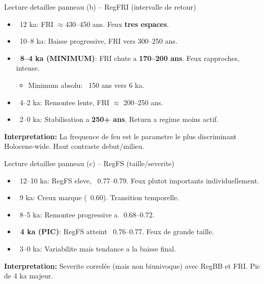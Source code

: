 \documentclass[aspectratio=169,11pt]{beamer}
\begin{document}
\begin{frame}{Lecture detaillee panneau (b) -- RegFRI (intervalle de retour)}
\small
\begin{itemize}
  \item \alert{~12 ka}: FRI $\approx 430$--450 ans. Feux \textbf{tres espaces}.
  
  \item \alert{~10--8 ka}: Baisse progressive, FRI vers 300--250 ans.
  
  \item \alert{\textbf{~8--4 ka (MINIMUM)}}: FRI chute a \textbf{170--200 ans}. Feux rapproches, intense.
  \begin{itemize}
    \item Minimum absolu: ~150 ans vers 6 ka.
  \end{itemize}
  
  \item \alert{~4--2 ka}: Remontee lente, FRI $\approx$ 200--250 ans.
  
  \item \alert{~2--0 ka}: Stabilisation a \textbf{250+ ans}. Return a regime moins actif.
\end{itemize}
\textbf{Interpretation:} La frequence de feu est le parametre le plus discriminant Holocene-wide. Haut contraste debut/milieu.
\end{frame}

\begin{frame}{Lecture detaillee panneau (c) -- RegFS (taille/severite)}
\small
\begin{itemize}
  \item \alert{~12--10 ka}: RegFS eleve, ~0.77--0.79. Feux plutot importants individuellement.
  
  \item \alert{~9 ka}: Creux marque (~0.60). Transition temporelle.
  
  \item \alert{~8--5 ka}: Remontee progressive a ~0.68--0.72.
  
  \item \alert{\textbf{~4 ka (PIC)}}: RegFS atteint ~0.76--0.77. Feux de grande taille.
  
  \item \alert{~3--0 ka}: Variabilite mais tendance a la baisse final.
\end{itemize}
\textbf{Interpretation:} Severite correlée (mais non biunivoque) avec RegBB et FRI. Pic de 4 ka majeur.
\end{frame}
\end{document}
